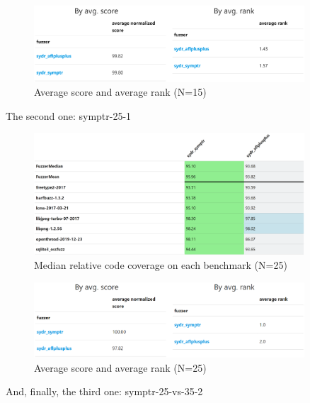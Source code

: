 \begin{figure}[h]
    \centering
    \includegraphics[width=0.9\textwidth]{assets/fuzzbench/symptr-15-1/avg-score-avg-rank.png}
    \caption{Average score and average rank (N=15)}
    \label{fig:fuzzbench-symptr-15-1-score-rank}
\end{figure}

The second one: symptr-25-1

\begin{figure}[h]
    \centering
    \includegraphics[width=0.9\textwidth]{assets/fuzzbench/symptr-25-1/median-relative-code-coverage-on-each-benchmark.png}
    \caption{Median relative code coverage on each benchmark (N=25)}
    \label{fig:fuzzbench-symptr-25-1-coverage}
\end{figure}

\begin{figure}[h]
    \centering
    \includegraphics[width=0.9\textwidth]{assets/fuzzbench/symptr-25-1/avg-score-avg-rank.png}
    \caption{Average score and average rank (N=25)}
    \label{fig:fuzzbench-symptr-25-1-score-rank}
\end{figure}

\newpage

And, finally, the third one: symptr-25-vs-35-2

